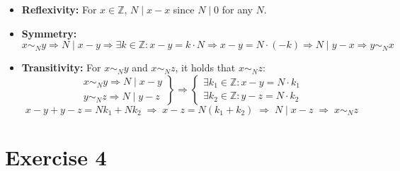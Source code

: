 \documentclass[a4paper]{scrreprt}
\newcommand\Z{\mathbb Z}
\begin{document}
\begin{itemize}
    \item \textbf{Reflexivity:} For $x\in\Z$, $N\mid x-x$ since $N\mid 0$ for any $N$.
    \item \textbf{Symmetry:} $x\sim_N y \Rightarrow N\mid x-y\Rightarrow\exists k\in\Z: x-y=k\cdot N
        \Rightarrow x-y=N\cdot(-k)\Rightarrow N\mid y-x\Rightarrow y\sim_N x$
    \item \textbf{Transitivity:} For $x\sim_N y$ and $x\sim_N z$, it holds that $x\sim_N z$:
        \[\left.\begin{array}{c}x\sim_N y\Rightarrow N\mid x-y\\
                y\sim_N z\Rightarrow N\mid y-z\end{array}\right\}\Rightarrow
            \left\{\begin{array}{c}\exists k_1\in\Z:x-y=N\cdot k_1\\
            \exists k_2\in\Z:y-z=N\cdot k_2\end{array}\right.\]
        \[x-y+y-z=N k_1 + N k_2\;\Rightarrow\;x-z=N(k_1+k_2)\;\Rightarrow
        \;N\mid x-z\;\Rightarrow\;x\sim_N z\]
\end{itemize}

\section*{Exercise 4}
\end{document}

